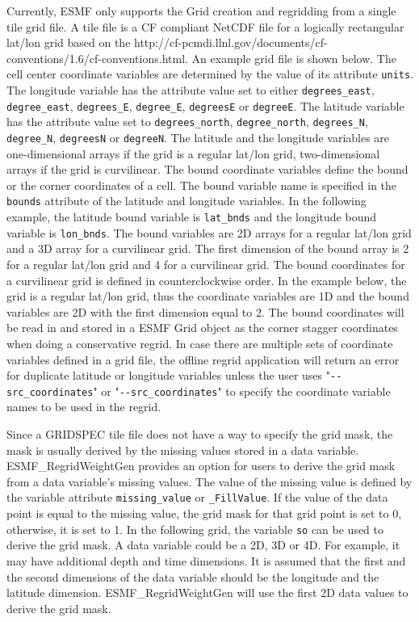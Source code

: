 Currently, ESMF only supports the Grid creation and regridding from a single tile grid file.  A tile file
is a CF compliant NetCDF file for a logically rectangular lat/lon grid based on the
 {http://cf-pcmdi.llnl.gov/documents/cf-conventions/1.6/cf-conventions.html}.   An example grid file is shown below.
The cell center coordinate variables are determined by the value of its attribute {\tt units}.  The longitude
variable has the attribute value set to either {\tt degrees\_east}, {\tt degree\_east}, {\tt degrees\_E}, {\tt degree\_E},
{\tt degreesE} or {\tt degreeE}.  The latitude variable has the attribute value set to {\tt degrees\_north}, {\tt degree\_north}, {\tt degrees\_N},
{\tt degree\_N}, {\tt degreesN} or {\tt degreeN}.   The latitude and the longitude variables are one-dimensional arrays if the grid is a regular lat/lon grid, two-dimensional arrays if the grid is curvilinear. The bound coordinate
variables define the bound or the corner coordinates of a cell.  The bound variable name is specified in the
{\tt bounds} attribute of the latitude and longitude variables.  In the following example, the latitude bound
variable is {\tt lat\_bnds} and the longitude bound variable is {\tt lon\_bnds}.  The bound variables are 2D
arrays for a regular lat/lon grid and a 3D array for a curvilinear grid.  The first dimension of the bound
array is 2 for a regular lat/lon grid and 4 for a curvilinear grid.  The bound coordinates for a curvilinear
grid is defined in counterclockwise order.  In the example below, the grid is a regular lat/lon
grid, thus the coordinate variables are 1D and the bound variables are 2D with the first dimension equal to 2.
The bound coordinates will be read in and stored in a ESMF Grid object as the corner stagger coordinates when doing a conservative regrid.  In case there are multiple sets of coordinate variables defined in a grid file,
the offline regrid application will return an error for duplicate latitude or longitude variables unless the user
uses "{\tt \verb+--+src\_coordinates}" or "{\tt \verb+--+src\_coordinates}" to specify the coordinate variable names
to be used in the regrid.

Since a GRIDSPEC tile file does not have a way to specify the grid mask, the mask is usually derived by the missing values stored in a data variable.  ESMF\_RegridWeightGen provides an option for users to
derive the grid mask from a data variable's missing values.  The value of the missing value is defined by the
variable attribute {\tt missing\_value} or {\tt \_FillValue}.  If the value of the data point is equal to the
missing value, the grid mask for that grid point is set to 0, otherwise, it is set to 1.   In the following
grid, the variable {\tt so} can be used to derive the grid mask.  A data variable could be a 2D, 3D or 4D.
For example, it may have additional depth and time dimensions.
It is assumed that the first and the second dimensions of the data variable should be the longitude and the
latitude dimension.  ESMF\_RegridWeightGen will use the first 2D data values to derive the grid mask.

